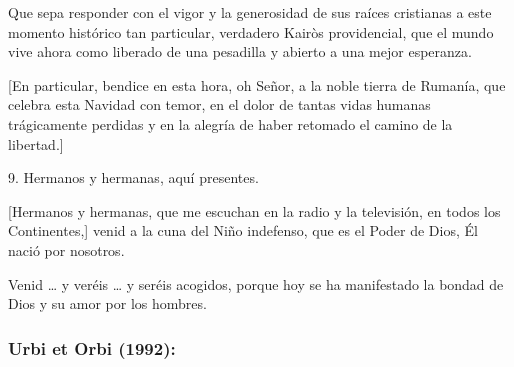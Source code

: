 \begin{body}
					Que sepa responder con el vigor y la generosidad de sus raíces cristianas a este momento histórico tan particular, verdadero Kairòs providencial, que el mundo vive ahora como liberado de una pesadilla y abierto a una mejor esperanza.
					
					{[}En particular, bendice en esta hora, oh Señor, a la noble tierra de Rumanía, que celebra esta Navidad con temor, en el dolor de tantas vidas humanas trágicamente perdidas y en la alegría de haber retomado el camino de la libertad.{]}
					
					9. Hermanos y hermanas, aquí presentes.
					
					{[}Hermanos y hermanas, que me escuchan en la radio y la televisión, en todos los Continentes,{]} venid a la cuna del Niño indefenso, que es el Poder de Dios, Él nació por nosotros.
					
					Venid \ldots{} y veréis \ldots{} y seréis acogidos, porque hoy se ha manifestado la bondad de Dios y su amor por los hombres.
				\end{body}


			\subsubsection{Urbi et Orbi (1992):}

